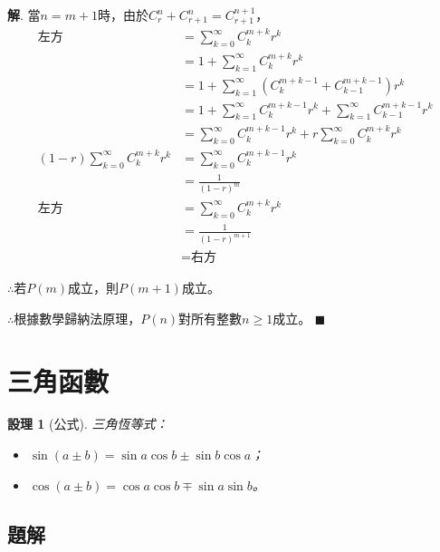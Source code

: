 \documentclass[12pt]{article}
\newtheorem*{proposition}{設理}
\newenvironment*{sol}{\par \textbf{解}.}{\hfill$\blacksquare$}
\begin{document}
\begin{enumerate}
\begin{sol}
                當$n=m+1$時，由於$C_r^n+C_{r+1}^n=C_{r+1}^{n+1}$，\begin{align*}
                    \textrm{左方}&=\sum_{k=0}^\infty C_k^{m+k}r^k\\
                    &=1+\sum_{k=1}^\infty C_k^{m+k}r^k\\
                    &=1+\sum_{k=1}^\infty (C_k^{m+k-1}+C_{k-1}^{m+k-1})r^k\\
                    &=1+\sum_{k=1}^\infty C_k^{m+k-1}r^k+\sum_{k=1}^\infty C_{k-1}^{m+k-1}r^k\\
                    &=\sum_{k=0}^\infty C_k^{m+k-1}r^k+r\sum_{k=0}^\infty C_k^{m+k}r^k\\
                    (1-r)\sum_{k=0}^\infty C_k^{m+k}r^k&=\sum_{k=0}^\infty C_k^{m+k-1}r^k\\
                    &=\frac{1}{(1-r)^m}\\
                    \textrm{左方}&=\sum_{k=0}^\infty C_k^{m+k}r^k\\
                    &=\frac{1}{(1-r)^{m+1}}\\
                    &=\textrm{右方}
                \end{align*}

                $\therefore$若$P(m)$成立，則$P(m+1)$成立。

                $\therefore$根據數學歸納法原理，$P(n)$對所有整數$n\geq 1$成立。
        \end{sol}
    \end{enumerate}

    \section*{三角函數}

    \begin{proposition}[公式]
        三角恆等式：\\
        \begin{itemize}
            \item $\sin(a\pm b)=\sin{a}\cos{b}\pm\sin{b}\cos{a}$；
            \item $\cos(a\pm b)=\cos{a}\cos{b}\mp\sin{a}\sin{b}$。
        \end{itemize}
    \end{proposition}

    \subsection*{題解}
\end{document}
